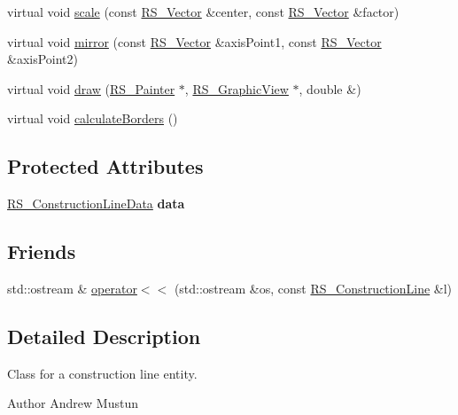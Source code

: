 \begin{DoxyCompactItemize}
\item 
virtual void \hyperlink{classRS__ConstructionLine_a37e13dec572d66999b5bfc572e36ac3b}{scale} (const \hyperlink{classRS__Vector}{R\-S\-\_\-\-Vector} \&center, const \hyperlink{classRS__Vector}{R\-S\-\_\-\-Vector} \&factor)
\item 
virtual void \hyperlink{classRS__ConstructionLine_a6793d38b5bfe4875a29990fc7f678b04}{mirror} (const \hyperlink{classRS__Vector}{R\-S\-\_\-\-Vector} \&axis\-Point1, const \hyperlink{classRS__Vector}{R\-S\-\_\-\-Vector} \&axis\-Point2)
\item 
virtual void \hyperlink{classRS__ConstructionLine_affa84ee167c93e6c69a14c863d74f88c}{draw} (\hyperlink{classRS__Painter}{R\-S\-\_\-\-Painter} $\ast$, \hyperlink{classRS__GraphicView}{R\-S\-\_\-\-Graphic\-View} $\ast$, double \&)
\item 
virtual void \hyperlink{classRS__ConstructionLine_a4d87b1a843532c65292ea623cf3f9145}{calculate\-Borders} ()
\end{DoxyCompactItemize}
\subsection*{Protected Attributes}
\begin{DoxyCompactItemize}
\item 
\hypertarget{classRS__ConstructionLine_a727b3711beffc6bddde276a96fcc96a8}{\hyperlink{classRS__ConstructionLineData}{R\-S\-\_\-\-Construction\-Line\-Data} {\bfseries data}}\label{classRS__ConstructionLine_a727b3711beffc6bddde276a96fcc96a8}

\end{DoxyCompactItemize}
\subsection*{Friends}
\begin{DoxyCompactItemize}
\item 
std\-::ostream \& \hyperlink{classRS__ConstructionLine_a94e2458f9aa05df177f777e89b937c4f}{operator$<$$<$} (std\-::ostream \&os, const \hyperlink{classRS__ConstructionLine}{R\-S\-\_\-\-Construction\-Line} \&l)
\end{DoxyCompactItemize}


\subsection{Detailed Description}
Class for a construction line entity.

\begin{DoxyAuthor}{Author}
Andrew Mustun 
\end{DoxyAuthor}


